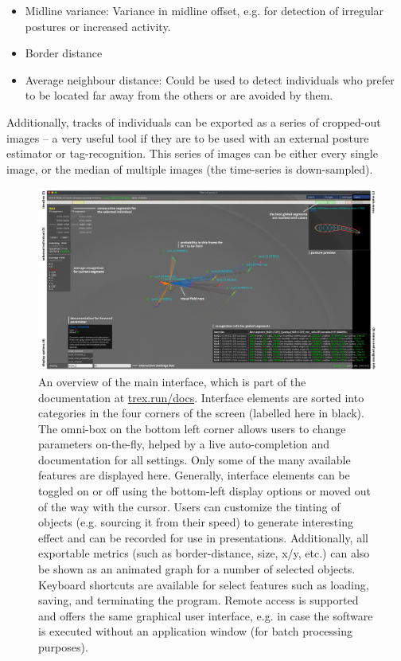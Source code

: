 \documentclass[9pt,lineno]{elife}
\newcommand{\TRex}{\protect\path{TRex}}
\begin{document}
\begin{appendixbox}
\begin{itemize}
\begin{itemize}
            \item Midline variance: Variance in midline offset, e.g. for detection of irregular postures or increased activity.
            \item Border distance
            \item Average neighbour distance: Could be used to detect individuals who prefer to be located far away from the others or are avoided by them.
        \end{itemize}
\end{itemize}

Additionally, tracks of individuals can be exported as a series of cropped-out images -- a very useful tool if they are to be used with an external posture estimator or tag-recognition. This series of images can be either every single image, or the median of multiple images (the time-series is down-sampled).
\end{appendixbox}

\begin{figure}
\begin{fullwidth}
\includegraphics[width=1.0\linewidth]{figures/trex_screenshot.pdf}
\caption{An overview of \TRex{'} the main interface, which is part of the documentation at \href{https://trex.run/docs}{trex.run/docs}. Interface elements are sorted into categories in the four corners of the screen (labelled here in black). The omni-box on the bottom left corner allows users to change parameters on-the-fly, helped by a live auto-completion and documentation for all settings. Only some of the many available features are displayed here. Generally, interface elements can be toggled on or off using the bottom-left display options or moved out of the way with the cursor. Users can customize the tinting of objects (e.g. sourcing it from their speed) to generate interesting effect and can be recorded for use in presentations. Additionally, all exportable metrics (such as border-distance, size, x/y, etc.) can also be shown as an animated graph for a number of selected objects. Keyboard shortcuts are available for select features such as loading, saving, and terminating the program. Remote access is supported and offers the same graphical user interface, e.g. in case the software is executed without an application window (for batch processing purposes).}
\label{fig:trex_screenshot}
\end{fullwidth}
\end{figure}
\end{document}
